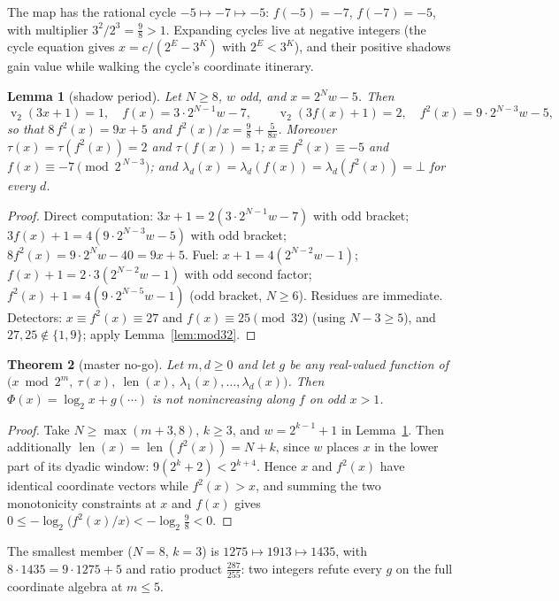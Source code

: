 \documentclass[11pt]{article}
\newtheorem{theorem}{Theorem}[section]
\newtheorem{lemma}[theorem]{Lemma}
\theoremstyle{definition}
\theoremstyle{remark}
\newcommand{\bitlen}{\operatorname{len}}
\DeclareMathOperator{\vv}{v}
\begin{document}
The map has the rational cycle $-5\mapsto-7\mapsto-5$:
$f(-5)=-7$, $f(-7)=-5$, with multiplier $3^2/2^3=\tfrac98>1$. Expanding
cycles live at negative integers (the cycle equation gives
$x=c/(2^{E}-3^{K})$ with $2^{E}<3^{K}$), and their positive shadows
gain value while walking the cycle's coordinate itinerary.

\begin{lemma}[shadow period]\label{lem:S}
Let $N\ge8$, $w$ odd, and $x=2^{N}w-5$. Then
\[
\vv_2(3x+1)=1,\quad f(x)=3\cdot2^{N-1}w-7,\qquad
\vv_2(3f(x)+1)=2,\quad f^{2}(x)=9\cdot2^{N-3}w-5,
\]
so that $8\,f^{2}(x)=9x+5$ and $f^{2}(x)/x=\tfrac98+\tfrac5{8x}$.
Moreover $\tau(x)=\tau(f^2(x))=2$ and $\tau(f(x))=1$;
$x\equiv f^{2}(x)\equiv-5$ and $f(x)\equiv-7\pmod{2^{\,N-3}}$; and
$\lambda_d(x)=\lambda_d(f(x))=\lambda_d(f^2(x))=\bot$ for every $d$.
\end{lemma}

\begin{proof}
Direct computation: $3x+1=2(3\cdot2^{N-1}w-7)$ with odd bracket;
$3f(x)+1=4(9\cdot2^{N-3}w-5)$ with odd bracket; $8f^2(x)=9\cdot2^Nw-40
=9x+5$. Fuel: $x+1=4(2^{N-2}w-1)$;
$f(x)+1=2\cdot3(2^{N-2}w-1)$ with odd second factor;
$f^2(x)+1=4(9\cdot2^{N-5}w-1)$ (odd bracket, $N\ge6$). Residues are
immediate. Detectors: $x\equiv f^2(x)\equiv27$ and
$f(x)\equiv25\pmod{32}$ (using $N-3\ge5$), and
$27,25\notin\{1,9\}$; apply Lemma~\ref{lem:mod32}.
\end{proof}

\begin{theorem}[master no-go]\label{thm:A}
Let $m,d\ge0$ and let $g$ be any real-valued function of
$\bigl(x\bmod2^m,\ \tau(x),\ \bitlen(x),\
\lambda_1(x),\dots,\lambda_d(x)\bigr)$. Then
$\Phi(x)=\log_2x+g(\cdots)$ is not nonincreasing along $f$ on odd
$x>1$.
\end{theorem}

\begin{proof}
Take $N\ge\max(m+3,8)$, $k\ge3$, and $w=2^{k-1}+1$ in
Lemma~\ref{lem:S}. Then additionally
$\bitlen(x)=\bitlen(f^{2}(x))=N+k$, since $w$ places $x$ in the lower
part of its dyadic window: $9(2^{k}+2)<2^{k+4}$. Hence
$x$ and $f^{2}(x)$ have identical coordinate vectors while
$f^{2}(x)>x$, and summing the two monotonicity constraints at $x$ and
$f(x)$ gives
$0\le-\log_2\bigl(f^{2}(x)/x\bigr)<-\log_2\tfrac98<0$.
\end{proof}

The smallest member ($N=8$, $k=3$) is
$1275\mapsto1913\mapsto1435$, with $8\cdot1435=9\cdot1275+5$ and ratio
product $\tfrac{287}{255}$: two integers refute every $g$ on the full
coordinate algebra at $m\le5$.
\end{document}

